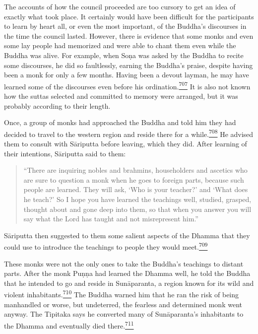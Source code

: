 The accounts of how the council proceeded are too cursory to get an idea
of exactly what took place. It certainly would have been difficult for
the participants to learn by heart all, or even the most important, of
the Buddha's discourses in the time the council lasted. However, there
is evidence that some monks and even some lay people had memorized and
were able to chant them even while the Buddha was alive. For example,
when Soṇa was asked by the Buddha to recite some discourses, he did so
faultlessly, earning the Buddha's praise, despite having been a monk for
only a few months. Having been a devout layman, he may have learned some
of the discourses even before his
ordination.\label{footprints_split_018.html_fnref707}\hyperref[footprints_split_025.htmlux5cux23fn707]{\textsuperscript{707}}
It is also not known how the suttas selected and committed to memory
were arranged, but it was probably according to their length.

Once, a group of monks had approached the Buddha and told him they had
decided to travel to the western region and reside there for a
while.\label{footprints_split_018.html_fnref708}\hyperref[footprints_split_025.htmlux5cux23fn708]{\textsuperscript{708}}
He advised them to consult with Sāriputta before leaving, which they
did. After learning of their intentions, Sāriputta said to them:

\begin{quote}
``There are inquiring nobles and brahmins, householders and ascetics who
are sure to question a monk when he goes to foreign parts, because such
people are learned. They will ask, `Who is your teacher?' and `What does
he teach?' So I hope you have learned the teachings well, studied,
grasped, thought about and gone deep into them, so that when you answer
you will say what the Lord has taught and not misrepresent him.''
\end{quote}

Sāriputta then suggested to them some salient aspects of the Dhamma that
they could use to introduce the teachings to people they would
meet.\label{footprints_split_018.html_fnref709}\hyperref[footprints_split_025.htmlux5cux23fn709]{\textsuperscript{709}}

These monks were not the only ones to take the Buddha's teachings to
distant parts. After the monk Puṇṇa had learned the Dhamma well, he told
the Buddha that he intended to go and reside in Sunāparanta, a region
known for its wild and violent
inhabitants.\label{footprints_split_018.html_fnref710}\hyperref[footprints_split_025.htmlux5cux23fn710]{\textsuperscript{710}}
The Buddha warned him that he ran the risk of being manhandled or worse,
but undeterred, the fearless and determined monk went anyway. The
Tipitaka says he converted many of Sunāparanta's inhabitants to the
Dhamma and eventually died
there.\label{footprints_split_018.html_fnref711}\hyperref[footprints_split_025.htmlux5cux23fn711]{\textsuperscript{711}}

